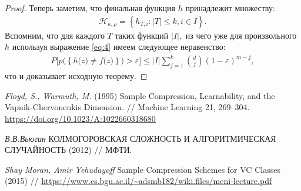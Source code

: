\documentclass[../main.tex]{subfiles}
\begin{document}
\begin{proof}
Теперь заметим, что финальная функция $h$ принадлежит множеству:
\[
    \label{eq:5}
    \begin{aligned}
        \mathcal{H}_{\kappa, \rho} = \left\{h_{T, i}: |T| \leq k, i \in I\right\}.
    \end{aligned}
\]
Вспомним, что для каждого $T$ таких функций $|I|,$ из чего уже для произвольного $h$ используя выражение \eqref{eq:4} имеем следующее неравенство:
\[
\begin{aligned}
P\bigr[p\bigr(\left\{h\bigr(z\bigr)\not=f\bigr(z\bigr) \right\}\bigr)>\varepsilon\bigr] \leq |I|\sum_{j=1}^{k}{{d}\choose{j}}\left(1-\varepsilon\right)^{m-j},
\end{aligned}
\]
что и доказывает исходную теорему.
\end{proof}

\begin{thebibliography}{99}
	\textit{Floyd, S., Warmuth, M.} (1995) Sample Compression, Learnability, and the Vapnik-Chervonenkis Dimension. // Machine Learning 21, 269–304.  \url{https://doi.org/10.1023/A:1022660318680}
	
    \textit{В.В.Вьюгин} КОЛМОГОРОВСКАЯ СЛОЖНОСТЬ И АЛГОРИТМИЧЕСКАЯ СЛУЧАЙНОСТЬ (2012) // МФТИ. 
    
    \textit{Shay Moran, Amir Yehudayoff} Sample Compression Schemes for VC Classes (2015) // \url{https://www.cs.bgu.ac.il/~adsmb182/wiki.files/meni-lecture.pdf}


\end{thebibliography}
\end{document}
